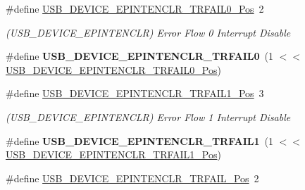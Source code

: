 \begin{DoxyCompactItemize}
\item 
\hypertarget{group___s_a_m_l21___u_s_b_gaa64f9c594de2fffaef8e11b9ecaa0efc}{}\#define \hyperlink{group___s_a_m_l21___u_s_b_gaa64f9c594de2fffaef8e11b9ecaa0efc}{U\+S\+B\+\_\+\+D\+E\+V\+I\+C\+E\+\_\+\+E\+P\+I\+N\+T\+E\+N\+C\+L\+R\+\_\+\+T\+R\+F\+A\+I\+L0\+\_\+\+Pos}~2\label{group___s_a_m_l21___u_s_b_gaa64f9c594de2fffaef8e11b9ecaa0efc}

\begin{DoxyCompactList}\small\item\em (U\+S\+B\+\_\+\+D\+E\+V\+I\+C\+E\+\_\+\+E\+P\+I\+N\+T\+E\+N\+C\+L\+R) Error Flow 0 Interrupt Disable \end{DoxyCompactList}\item 
\hypertarget{group___s_a_m_l21___u_s_b_ga6e6a507b0b9d7370dfee72051b6aede7}{}\#define {\bfseries U\+S\+B\+\_\+\+D\+E\+V\+I\+C\+E\+\_\+\+E\+P\+I\+N\+T\+E\+N\+C\+L\+R\+\_\+\+T\+R\+F\+A\+I\+L0}~(1 $<$$<$ \hyperlink{group___s_a_m_l21___u_s_b_gaa64f9c594de2fffaef8e11b9ecaa0efc}{U\+S\+B\+\_\+\+D\+E\+V\+I\+C\+E\+\_\+\+E\+P\+I\+N\+T\+E\+N\+C\+L\+R\+\_\+\+T\+R\+F\+A\+I\+L0\+\_\+\+Pos})\label{group___s_a_m_l21___u_s_b_ga6e6a507b0b9d7370dfee72051b6aede7}

\item 
\hypertarget{group___s_a_m_l21___u_s_b_gad7709a825ef24e842364c04f9b99e384}{}\#define \hyperlink{group___s_a_m_l21___u_s_b_gad7709a825ef24e842364c04f9b99e384}{U\+S\+B\+\_\+\+D\+E\+V\+I\+C\+E\+\_\+\+E\+P\+I\+N\+T\+E\+N\+C\+L\+R\+\_\+\+T\+R\+F\+A\+I\+L1\+\_\+\+Pos}~3\label{group___s_a_m_l21___u_s_b_gad7709a825ef24e842364c04f9b99e384}

\begin{DoxyCompactList}\small\item\em (U\+S\+B\+\_\+\+D\+E\+V\+I\+C\+E\+\_\+\+E\+P\+I\+N\+T\+E\+N\+C\+L\+R) Error Flow 1 Interrupt Disable \end{DoxyCompactList}\item 
\hypertarget{group___s_a_m_l21___u_s_b_ga2ac05317671e3c1ac7c37c3e764183e2}{}\#define {\bfseries U\+S\+B\+\_\+\+D\+E\+V\+I\+C\+E\+\_\+\+E\+P\+I\+N\+T\+E\+N\+C\+L\+R\+\_\+\+T\+R\+F\+A\+I\+L1}~(1 $<$$<$ \hyperlink{group___s_a_m_l21___u_s_b_gad7709a825ef24e842364c04f9b99e384}{U\+S\+B\+\_\+\+D\+E\+V\+I\+C\+E\+\_\+\+E\+P\+I\+N\+T\+E\+N\+C\+L\+R\+\_\+\+T\+R\+F\+A\+I\+L1\+\_\+\+Pos})\label{group___s_a_m_l21___u_s_b_ga2ac05317671e3c1ac7c37c3e764183e2}

\item 
\hypertarget{group___s_a_m_l21___u_s_b_gafe24801747027f37cd56d49ece4bab43}{}\#define \hyperlink{group___s_a_m_l21___u_s_b_gafe24801747027f37cd56d49ece4bab43}{U\+S\+B\+\_\+\+D\+E\+V\+I\+C\+E\+\_\+\+E\+P\+I\+N\+T\+E\+N\+C\+L\+R\+\_\+\+T\+R\+F\+A\+I\+L\+\_\+\+Pos}~2\label{group___s_a_m_l21___u_s_b_gafe24801747027f37cd56d49ece4bab43}


\end{DoxyCompactItemize}
